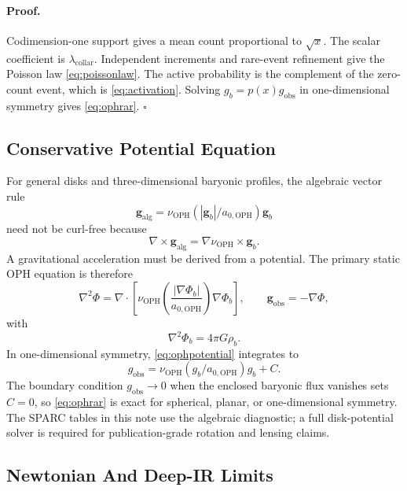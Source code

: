 \documentclass[11pt]{article}
\newcommand{\OPH}{\mathrm{OPH}}
\newcommand{\aoph}{a_{0,\mathrm{OPH}}}
\newcommand{\lambdac}{\lambda_{\mathrm{collar}}}
\begin{document}
\paragraph{Proof.}
Codimension-one support gives a mean count proportional to \(\sqrt{x}\).
The scalar coefficient is \(\lambdac\).  Independent increments and rare-event
refinement give the Poisson law \eqref{eq:poissonlaw}.  The active probability is
the complement of the zero-count event, which is \eqref{eq:activation}.
Solving \(g_b=p(x)g_{\mathrm{obs}}\) in one-dimensional symmetry gives
\eqref{eq:ophrar}. \(\square\)

\subsection{Conservative Potential Equation}

For general disks and three-dimensional baryonic profiles, the algebraic vector
rule
\begin{equation}
  \mathbf g_{\mathrm{alg}}
  =
  \nu_{\OPH}(|\mathbf g_b|/\aoph)\mathbf g_b
\end{equation}
need not be curl-free because
\begin{equation}
  \nabla\times\mathbf g_{\mathrm{alg}}
  =
  \nabla\nu_{\OPH}\times\mathbf g_b.
\end{equation}
A gravitational acceleration must be derived from a potential.  The primary
static OPH equation is therefore
\begin{equation}
  \nabla^2\Phi
  =
  \nabla\cdot
  \left[
    \nu_{\OPH}\!\left(\frac{|\nabla\Phi_b|}{\aoph}\right)
    \nabla\Phi_b
  \right],
  \qquad
  \mathbf g_{\mathrm{obs}}=-\nabla\Phi,
  \label{eq:ophpotential}
\end{equation}
with
\begin{equation}
  \nabla^2\Phi_b=4\pi G\rho_b.
\end{equation}
In one-dimensional symmetry, \eqref{eq:ophpotential} integrates to
\begin{equation}
  g_{\mathrm{obs}}
  =
  \nu_{\OPH}(g_b/\aoph)g_b+C.
\end{equation}
The boundary condition \(g_{\mathrm{obs}}\to0\) when the enclosed baryonic
flux vanishes sets \(C=0\), so \eqref{eq:ophrar} is exact for spherical,
planar, or one-dimensional symmetry.  The SPARC tables in this note use the
algebraic diagnostic; a full disk-potential solver is required for
publication-grade rotation and lensing claims.

\subsection{Newtonian And Deep-IR Limits}
\end{document}
